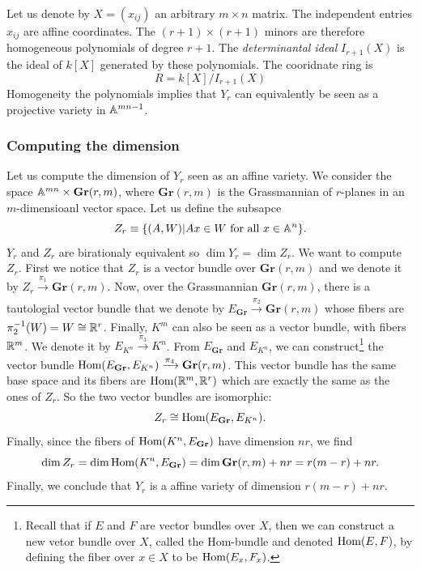             Let us denote by $X=(x_{ij})$ an arbitrary $m\times n$ matrix. The independent entries $x_{ij}$ are affine coordinates. The $(r+1)\times(r+1)$ minors are therefore homogeneous polynomials of degree $r+1$. The \emph{determinantal ideal} $I_{r+1}(X)$ is the ideal of $k[X]$ generated by these polynomials. The cooridnate ring is 
            \begin{equation}
                R=k[X]/I_{r+1}(X)
            \end{equation}
            Homogeneity the polynomials implies that $Y_r$ can equivalently be seen as a projective variety in $\mathbb{A}^{mn-1}$.

        \subsubsection{Computing the dimension}
            
            Let us compute the dimension of $Y_r$ seen as an affine variety. We consider the space $\mathbb{A}^{mn}\times\textbf{Gr}(r,m)$, where $\textbf{Gr}(r,m)$ is the Grassmannian of $r$-planes in an $m$-dimensioanl vector space. Let us define the subsapce
            \begin{equation}
                Z_r\equiv\{(A,W)|Ax\in W\text{ for all } x\in\mathbb{A}^{n}\}.
            \end{equation}
            $Y_r$ and $Z_r$ are birationaly equivalent so $\dim Y_r=\dim Z_r$. We want to compute $Z_r$. First we notice that $Z_r$ is a vector bundle over $\textbf{Gr}(r,m)$ and we denote it by $Z_r\xrightarrow[]{\pi_1}\textbf{Gr}(r,m)$. Now, over the Grassmannian $\textbf{Gr}(r,m)$, there is a tautologial vector bundle that we denote by $E_{\textbf{Gr}}\xrightarrow[]{\pi_2}\textbf{Gr}(r,m)$ whose fibers are $\pi^{-1}_2(W)=W\cong\mathbb{R}^r$. Finally, $K^m$ can also be seen as a vector bundle, with fibers $\mathbb{R}^m$. We denote it by $E_{K^n}\xrightarrow[]{\pi_3}K^n$. From $E_{\textbf{Gr}}$ and $E_{K^n}$, we can construct\footnote{Recall that if $E$ and $F$ are vector bundles over $X$, then we can construct a new vetor bundle over $X$, called the Hom-bundle and denoted $\text{Hom}(E,F)$, by defining the fiber over $x\in X$ to be $\text{Hom}(E_x,F_x)$.} the vector bundle $\text{Hom}(E_{\textbf{Gr}},E_{K^n})\xrightarrow[]{\pi_4}\textbf{Gr}(r,m)$. This vector bundle has the same base space and its fibers are $\text{Hom}(\mathbb{R}^m,\mathbb{R}^r)$ which are exactly the same as the ones of $Z_r$. So the two vector bundles are isomorphic:
            \begin{equation}
                Z_r\cong\text{Hom}(E_{\textbf{Gr}},E_{K^n}).
            \end{equation}
            Finally, since the fibers of $\text{Hom}(K^n,E_{\textbf{Gr}})$ have dimension $nr$, we find
            \begin{equation}
                \dim Z_r = \dim\text{Hom}(K^n,E_{\textbf{Gr}}) = \dim\textbf{Gr}(r,m)+nr = r(m-r)+nr.
            \end{equation}
            Finally, we conclude that $Y_r$ is a affine variety of dimension $r(m-r)+nr$.

